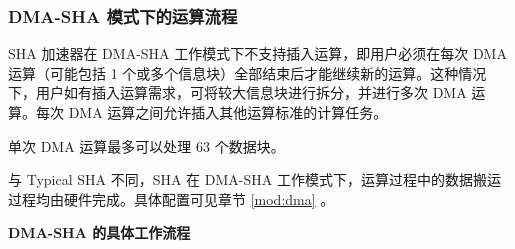 \documentclass[main\_\_CN.tex]{subfiles}
\begin{document}
\subsubsection{DMA-SHA 模式下的运算流程}\label{sec:sha-dma-sha}

\chipname{} SHA 加速器在 DMA-SHA 工作模式下不支持插入运算，即用户必须在每次 DMA 运算（可能包括 1 个或多个信息块）全部结束后才能继续新的运算。这种情况下，用户如有插入运算需求，可将较大信息块进行拆分，并进行多次 DMA 运算。每次 DMA 运算之间允许插入其他运算标准的计算任务。

单次 DMA 运算最多可以处理 63 个数据块。


与 Typical SHA 不同，SHA 在 DMA-SHA 工作模式下，运算过程中的数据搬运过程均由硬件完成。具体配置可见章节 \ref{mod:dma} \textit{}。

\textbf{DMA-SHA 的具体工作流程}
\end{document}
